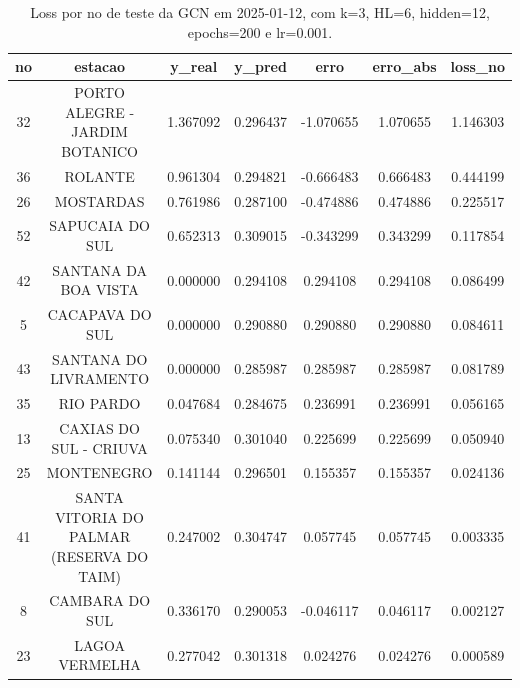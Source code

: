 \begin{table}[h]
\centering
\caption{Loss por no de teste da GCN em 2025-01-12, com k=3, HL=6, hidden=12, epochs=200 e lr=0.001.}
\label{tab:gcn_loss_k3_hl6_h12_e200_d20250112}
\begin{tabular}{ccccccc}
\toprule
no & estacao & y\_real & y\_pred & erro & erro\_abs & loss\_no \\
\midrule
32 & PORTO ALEGRE - JARDIM BOTANICO & 1.367092 & 0.296437 & -1.070655 & 1.070655 & 1.146303 \\
36 & ROLANTE & 0.961304 & 0.294821 & -0.666483 & 0.666483 & 0.444199 \\
26 & MOSTARDAS & 0.761986 & 0.287100 & -0.474886 & 0.474886 & 0.225517 \\
52 & SAPUCAIA DO SUL & 0.652313 & 0.309015 & -0.343299 & 0.343299 & 0.117854 \\
42 & SANTANA DA BOA VISTA & 0.000000 & 0.294108 & 0.294108 & 0.294108 & 0.086499 \\
5 & CACAPAVA DO SUL & 0.000000 & 0.290880 & 0.290880 & 0.290880 & 0.084611 \\
43 & SANTANA DO LIVRAMENTO & 0.000000 & 0.285987 & 0.285987 & 0.285987 & 0.081789 \\
35 & RIO PARDO & 0.047684 & 0.284675 & 0.236991 & 0.236991 & 0.056165 \\
13 & CAXIAS DO SUL - CRIUVA & 0.075340 & 0.301040 & 0.225699 & 0.225699 & 0.050940 \\
25 & MONTENEGRO & 0.141144 & 0.296501 & 0.155357 & 0.155357 & 0.024136 \\
41 & SANTA VITORIA DO PALMAR (RESERVA DO TAIM) & 0.247002 & 0.304747 & 0.057745 & 0.057745 & 0.003335 \\
8 & CAMBARA DO SUL & 0.336170 & 0.290053 & -0.046117 & 0.046117 & 0.002127 \\
23 & LAGOA VERMELHA & 0.277042 & 0.301318 & 0.024276 & 0.024276 & 0.000589 \\
\bottomrule
\end{tabular}
\end{table}
